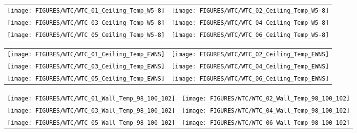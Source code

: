 \begin{figure}[p]
\begin{tabular*}{\textwidth}{l@{\extracolsep{\fill}}r}
\texttt{[image: FIGURES/WTC/WTC\_01\_Ceiling\_Temp\_W5-8]} &
\texttt{[image: FIGURES/WTC/WTC\_02\_Ceiling\_Temp\_W5-8]} \\
\texttt{[image: FIGURES/WTC/WTC\_03\_Ceiling\_Temp\_W5-8]} &
\texttt{[image: FIGURES/WTC/WTC\_04\_Ceiling\_Temp\_W5-8]} \\
\texttt{[image: FIGURES/WTC/WTC\_05\_Ceiling\_Temp\_W5-8]} &
\texttt{[image: FIGURES/WTC/WTC\_06\_Ceiling\_Temp\_W5-8]}
\end{tabular*}
\label{NIST_WTC_Ceiling_W5-8}
\end{figure}

\begin{figure}[p]
\begin{tabular*}{\textwidth}{l@{\extracolsep{\fill}}r}
\texttt{[image: FIGURES/WTC/WTC\_01\_Ceiling\_Temp\_EWNS]} &
\texttt{[image: FIGURES/WTC/WTC\_02\_Ceiling\_Temp\_EWNS]} \\
\texttt{[image: FIGURES/WTC/WTC\_03\_Ceiling\_Temp\_EWNS]} &
\texttt{[image: FIGURES/WTC/WTC\_04\_Ceiling\_Temp\_EWNS]} \\
\texttt{[image: FIGURES/WTC/WTC\_05\_Ceiling\_Temp\_EWNS]} &
\texttt{[image: FIGURES/WTC/WTC\_06\_Ceiling\_Temp\_EWNS]}
\end{tabular*}
\label{NIST_WTC_Ceiling_EWNS}
\end{figure}

\begin{figure}[p]
\begin{tabular*}{\textwidth}{l@{\extracolsep{\fill}}r}
\texttt{[image: FIGURES/WTC/WTC\_01\_Wall\_Temp\_98\_100\_102]} &
\texttt{[image: FIGURES/WTC/WTC\_02\_Wall\_Temp\_98\_100\_102]} \\
\texttt{[image: FIGURES/WTC/WTC\_03\_Wall\_Temp\_98\_100\_102]} &
\texttt{[image: FIGURES/WTC/WTC\_04\_Wall\_Temp\_98\_100\_102]} \\
\texttt{[image: FIGURES/WTC/WTC\_05\_Wall\_Temp\_98\_100\_102]} &
\texttt{[image: FIGURES/WTC/WTC\_06\_Wall\_Temp\_98\_100\_102]}
\end{tabular*}
\label{NIST_WTC_Wall_98_100_102}
\end{figure}

